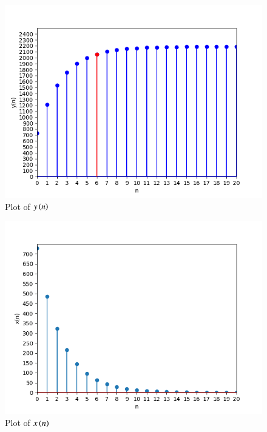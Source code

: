 \documentclass[journal,12pt,twocolumn]{IEEEtran}
\theoremstyle{remark}
\begin{document}
\begin{figure}[!ht]
\centering
\begin{center}
\includegraphics[width=\columnwidth]{Figure_1}
\end{center}
\caption{Plot of $y\left(n\right)$}
\end{figure}
\begin{figure}[!ht]
\centering
\begin{center}
\includegraphics[width=\columnwidth]{Figure_2}
\end{center}
\caption{Plot of $x\left(n\right)$}
\end{figure}
\end{document}
